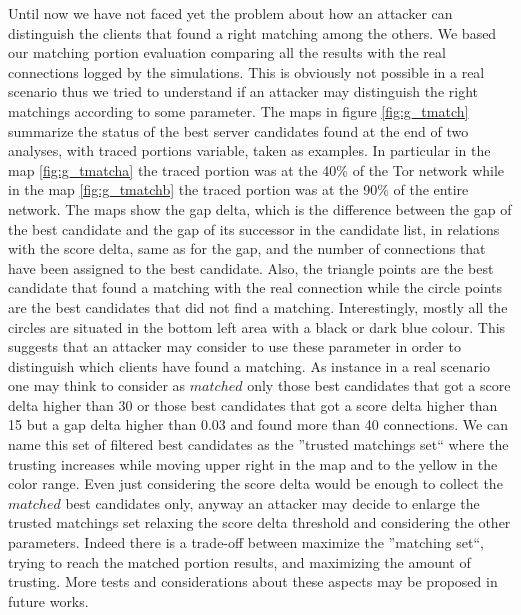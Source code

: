 Until now we have not faced yet the problem about how an attacker can distinguish
the clients that found a right matching among the others. We based our
matching portion evaluation comparing all the results with the real
connections logged by the simulations. This is obviously not possible
in a real scenario thus we tried to understand if an attacker may
distinguish the right matchings according to some parameter.
The maps in figure \ref{fig:g_tmatch} summarize the status of the best
server candidates found at the end of two analyses, with traced portions
variable, taken as
examples. In particular in the map \ref{fig:g_tmatcha} the traced
portion was at the 40\% of the Tor network while in the map
\ref{fig:g_tmatchb} the traced portion was at the 90\% of the entire
network. The maps show the gap delta, which is the difference between
the gap of the best
candidate and the gap of its successor in the candidate list,  in
relations with the score delta, same as for the gap, and the number of
connections that have been assigned to the best candidate. 
Also, the triangle points are the best candidate that found a matching
with the real connection while the circle points are the 
best candidates that did not find a matching.
Interestingly, mostly all the circles are situated in the bottom left
area with a black or dark blue colour. This suggests that an attacker
may consider to use these parameter in order to distinguish which
clients have found a matching. As instance in a real scenario one may
think to consider as $matched$ only those best candidates that got a
score delta higher than 30 or those best candidates that got a score
delta higher than 15 but a gap delta higher than 0.03 and found more
than 40 connections. We can name this set of filtered best candidates as
the ''trusted matchings set`` where the trusting increases while moving
upper right in the map and to the yellow in the color range. Even just
considering the score delta would be enough to collect the
$matched$ best candidates only, anyway an attacker may decide to enlarge
the trusted matchings set relaxing the score delta threshold and
considering the other parameters. Indeed there is a trade-off between
maximize the ''matching set``, trying to reach the matched portion
results, and maximizing the amount of
trusting. More tests and considerations about these aspects may be
proposed in future works.
\newpage
